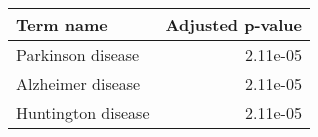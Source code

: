 \begin{tabular}{lr}
\toprule
         Term name &  Adjusted p-value \\
\midrule
 Parkinson disease &          2.11e-05 \\
 Alzheimer disease &          2.11e-05 \\
Huntington disease &          2.11e-05 \\
\bottomrule
\end{tabular}
